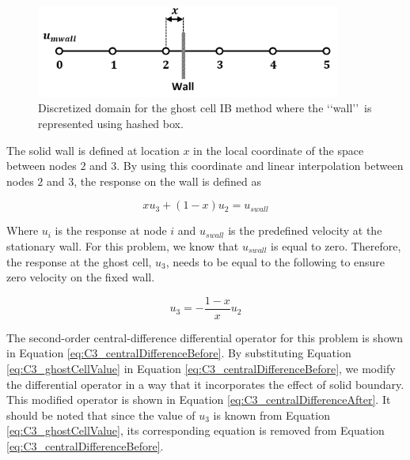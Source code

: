 \begin{figure}[H]
    \centering
    \includegraphics[width=10.00cm]{Chapter_3/figure/ghost_cell_discretization.png}
    \caption{Discretized domain for the ghost cell IB method where the \lq\lq wall\rq\rq\ is represented using hashed box.}
    \label{fig:C3_discretizedGhostCell}
\end{figure}

The solid wall is defined at location $x$ in the local coordinate of the space between nodes $2$ and $3$. By using this coordinate and linear interpolation between nodes $2$ and $3$, the response on the wall is defined as

\begin{equation}
    x u_3 + (1 - x) u_2 = u_{swall}
\end{equation}

Where $u_i$ is the response at node $i$ and $u_{swall}$ is the predefined velocity at the stationary wall. For this problem, we know that $u_{swall}$ is equal to zero. Therefore, the response at the ghost cell, $u_3$, needs to be equal to the following to ensure zero velocity on the fixed wall.

\begin{equation}\label{eq:C3_ghostCellValue}
    u_3 = -\frac{1 - x}{x} u_2
\end{equation}

The second-order central-difference differential operator for this problem is shown in Equation \eqref{eq:C3_centralDifferenceBefore}. By substituting Equation \eqref{eq:C3_ghostCellValue} in Equation \eqref{eq:C3_centralDifferenceBefore}, we modify the differential operator in a way that it incorporates the effect of solid boundary. This modified operator is shown in Equation \eqref{eq:C3_centralDifferenceAfter}. It should be noted that since the value of $u_3$ is known from Equation \eqref{eq:C3_ghostCellValue}, its corresponding equation is removed from Equation \eqref{eq:C3_centralDifferenceBefore}.

